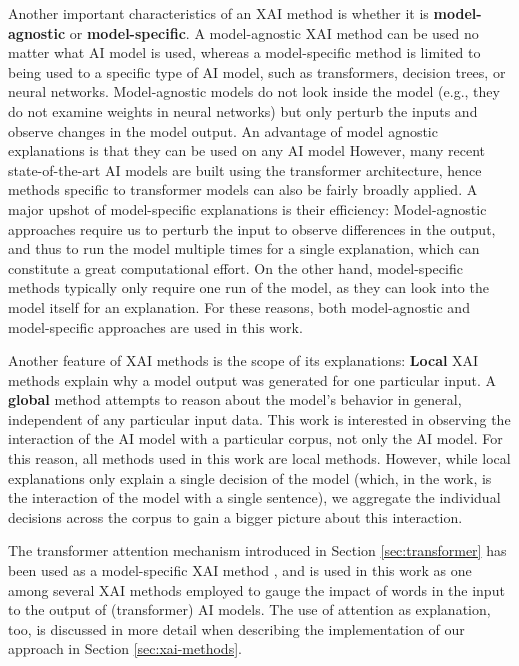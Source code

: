 Another important characteristics of an XAI method is whether it is \textbf{model-agnostic} or \textbf{model-specific}.
A model-agnostic XAI method can be used no matter what AI model is used, whereas a model-specific method is limited to being used to a specific type of AI model, such as transformers, decision trees, or neural networks.
Model-agnostic models do not look inside the model (e.g., they do not examine weights in neural networks) but only perturb the inputs and observe changes in the model output.
An advantage of model agnostic explanations is that they can be used on any AI model
However, many recent state-of-the-art AI models are built using the transformer architecture, hence methods specific to transformer models can also be fairly broadly applied.
A major upshot of model-specific explanations is their efficiency:
Model-agnostic approaches require us to perturb the input to observe differences in the output, and thus to run the model multiple times for a single explanation, which can constitute a great computational effort.
On the other hand, model-specific methods typically only require one run of the model, as they can look into the model itself for an explanation.
For these reasons, both model-agnostic and model-specific approaches are used in this work.

Another feature of XAI methods is the scope of its explanations:
\textbf{Local} XAI methods explain why a model output was generated for one particular input.
A \textbf{global} method attempts to reason about the model's behavior in general, independent of any particular input data.
This work is interested in observing the interaction of the AI model with a particular corpus, not only the AI model.
For this reason, all methods used in this work are local methods.
However, while local explanations only explain a single decision of the model (which, in the work, is the interaction of the model with a single sentence), we aggregate the individual decisions across the corpus to gain a bigger picture about this interaction.

The transformer attention mechanism introduced in Section \ref{sec:transformer} has been used as a model-specific XAI method
\cite{liUnderstandingNeuralNetworks2017}
\cite{leiInterpretableNeuralModels2017}
, and is used in this work as one among several XAI methods employed to gauge the impact of words in the input to the output of (transformer) AI models.
The use of attention as explanation, too, is discussed in more detail when describing the implementation of our approach in Section \ref{sec:xai-methods}.

